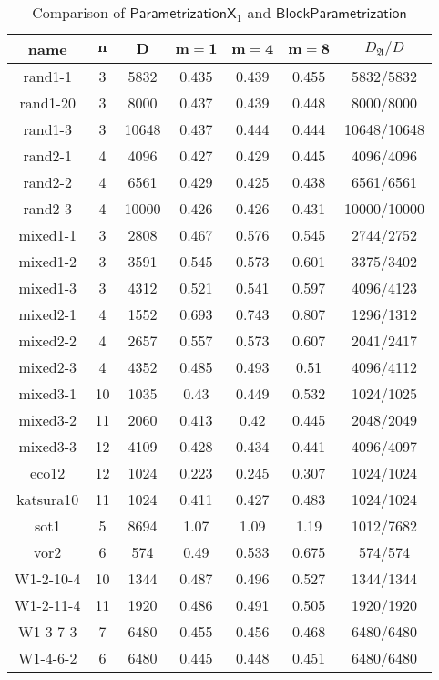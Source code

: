 \documentclass[12pt]{article}
\newcommand{\mainalgoname}{\mathsf{ BlockParametrization}}
\begin{document}
\begin{table}[H]
 \def\arraystretch{1.2}
\setlength\tabcolsep{6pt}
	\caption{Comparison of $\mathsf{ParametrizationX}_1$ and $\mainalgoname$}
        \begin{center}
\begin{tabular}{c|c|c|c|c|c|c}
\textbf{name}& $\bm{n}$ & $\bm{D}$ & $\bm{m = 1}$ & $\bm{m = 4}$ & $\bm{m = 8}$&$D_\mathfrak{A}/D$\\
\hline
rand1-1&3 &5832&0.435&0.439&0.455&5832/5832\\
rand1-20&3 &8000&0.437&0.439&0.448&8000/8000\\
rand1-3&3 &10648&0.437&0.444&0.444&10648/10648\\
rand2-1&4 &4096&0.427&0.429&0.445&4096/4096\\
rand2-2&4 &6561&0.429&0.425&0.438&6561/6561\\
rand2-3&4 &10000&0.426&0.426&0.431&10000/10000\\
mixed1-1&3 &2808&0.467&0.576&0.545& 2744/2752\\
mixed1-2&3 &3591&0.545&0.573&0.601& 3375/3402\\
mixed1-3&3 &4312&0.521&0.541&0.597& 4096/4123\\
mixed2-1&4 &1552&0.693&0.743&0.807& 1296/1312\\
mixed2-2&4 &2657&0.557&0.573&0.607& 2041/2417\\
mixed2-3&4 &4352&0.485&0.493&0.51& 4096/4112\\
mixed3-1&10 &1035&0.43&0.449&0.532& 1024/1025\\
mixed3-2&11 &2060&0.413&0.42&0.445& 2048/2049\\
mixed3-3&12 &4109&0.428&0.434&0.441& 4096/4097\\
eco12&12 &1024&0.223&0.245&0.307&1024/1024\\
katsura10&11 &1024&0.411&0.427&0.483&1024/1024\\
sot1&5 &8694&1.07&1.09&1.19 & 1012/7682\\
vor2&6 &574&0.49&0.533&0.675&574/574\\
W1-2-10-4&10 &1344&0.487&0.496&0.527&1344/1344\\
W1-2-11-4&11 &1920&0.486&0.491&0.505&1920/1920\\
W1-3-7-3&7 &6480&0.455&0.456&0.468&6480/6480\\
W1-4-6-2&6 &6480&0.445&0.448&0.451&6480/6480
\end{tabular}
       \end{center}
\end{table}




\end{document}
